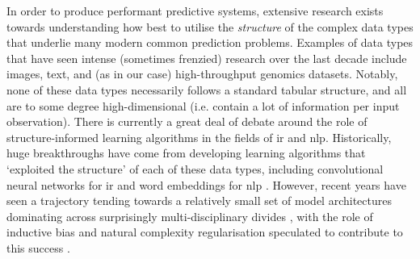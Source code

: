 \documentclass[thesis.tex]{subfiles}
\begin{document}
In order to produce performant predictive systems, extensive research exists towards understanding how best to utilise the \emph{structure} of the complex data types that underlie many modern common prediction problems. Examples of data types that have seen intense (sometimes frenzied) research over the last decade include images, text, and (as in our case) high-throughput genomics datasets. Notably, none of these data types necessarily follows a standard tabular structure, and all are to some degree high-dimensional (i.e. contain a lot of information per input observation). There is currently a great deal of debate around the role of structure-informed learning algorithms in the fields of \gls{ir} and \gls{nlp}. Historically, huge breakthroughs have come from developing learning algorithms that `exploited the structure' of each of these data types, including convolutional neural networks for \gls{ir} \citep{krizhevsky_imagenet_2012, he_deep_2016, huang_densely_2018} and word embeddings for \gls{nlp} \citep{mikolov_efficient_2013, bojanowski_enriching_2017, almeida_word_2019}. However, recent years have seen a trajectory tending towards a relatively small set of model architectures dominating across surprisingly multi-disciplinary divides \citep{vaswani_attention_2017, dosovitskiy_image_2021}, with the role of inductive bias and natural complexity regularisation speculated to contribute to this success \citep{de_palma_random_2019, valle-perez_deep_2019, goldblum_no_2023}.
\end{document}
